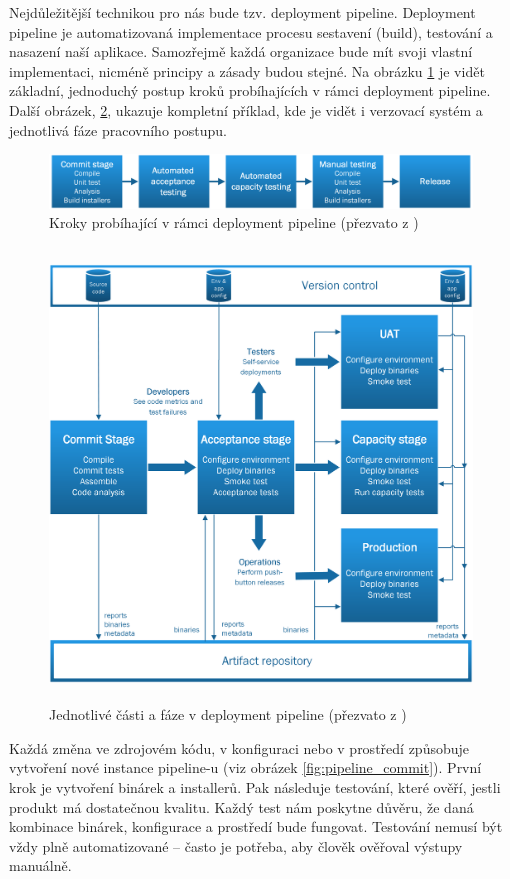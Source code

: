 Nejdůležitější technikou pro nás bude tzv. deployment pipeline. Deployment pipeline je automatizovaná implementace procesu sestavení (build), testování a nasazení naší aplikace. Samozřejmě každá organizace bude mít svoji vlastní implementaci, nicméně principy a zásady budou stejné. Na obrázku \ref{fig:pipeline_overview} je vidět základní, jednoduchý postup kroků probíhajících v rámci deployment pipeline. Další obrázek, \ref{fig:pipeline}, ukazuje kompletní příklad, kde je vidět i verzovací systém a jednotlivá fáze pracovního postupu.

\begin{figure}[]
  \centering
  \includegraphics[width=15cm]{fig/pipeline_overview.png}
  \caption{Kroky probíhající v rámci deployment pipeline (přezvato z \cite{ContDelivery})}
  \label{fig:pipeline_overview}
\end{figure}

\begin{figure}[]
  \centering
  \includegraphics[height=12cm]{fig/pipeline_basic.png}
  \caption{Jednotlivé části a fáze v deployment pipeline (přezvato z \cite{ContDelivery})}
  \label{fig:pipeline}
\end{figure}

Každá změna ve zdrojovém kódu, v konfiguraci nebo v prostředí způsobuje vytvoření nové instance pipeline-u (viz obrázek \ref{fig:pipeline_commit}). První krok je vytvoření binárek a installerů. Pak následuje testování, které ověří, jestli produkt má dostatečnou kvalitu. Každý test nám poskytne důvěru, že daná kombinace binárek, konfigurace a prostředí bude fungovat. Testování nemusí být vždy plně automatizované -- často je potřeba, aby člověk ověřoval výstupy manuálně. 

